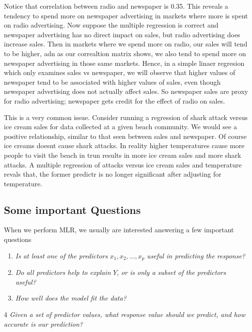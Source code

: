 \documentclass[
  letterpaper,
  DIV=11,
  numbers=noendperiod]{scrreprt}
\begin{document}
Notice that correlation between radio and newspaper is 0.35. This
reveals a tendency to spend more on newspaper advertising in markets
where more is spent on radio advertising. Now suppose the multiple
regression is correct and newspaper advertising has no direct impact on
sales, but radio advertising does increase sales. Then in markets where
we spend more on radio, our sales will tend to be higher, adn as our
correaltion matrix shows, we also tend to spend more on newspaper
advertising in those same markets. Hence, in a simple linaer regresion
which only examines sales vs newspaper, we will observe that higher
values of newspaper tend to be associated with higher values of sales,
even though newspaper advertising does not actually affect sales. So
newspaper sales are proxy for radio advertising; newspaper gets credit
for the effect of radio on sales.

This is a very common issue. Consider running a regression of shark
attack versus ice cream sales for data collected at a given beach
community. We would see a positive relationship, similar to that seen
between sales and newspaper. Of course ice creams doesnt cause shark
attacks. In reality higher temperatures cause more people to visit the
beach in trun results in more ice cream sales and more shark attacks. A
multiple regression of attacks versus ice cream sales and temperature
revals that, the former predictr is no longer significant after
adjusting for temperature.

\hypertarget{some-important-questions}{%
\subsection{Some important Questions}\label{some-important-questions}}

When we perform MLR, we usually are interested answering a few important
questions

\begin{enumerate}
\def\labelenumi{\arabic{enumi}.}
\item
  \emph{Is at least one of the predictors} \(x_1, x_2, \dots, x_p\)
  \emph{useful in predicting the response?}
\item
  \emph{Do all predictors help to explain} \(Y\), \emph{or is only a
  subset of the predictors useful?}
\item
  \emph{How well does the model fit the data?}
\end{enumerate}

4 \emph{Given a set of predictor values, what response value should we
predict, and how accurate is our prediction?}
\end{document}
